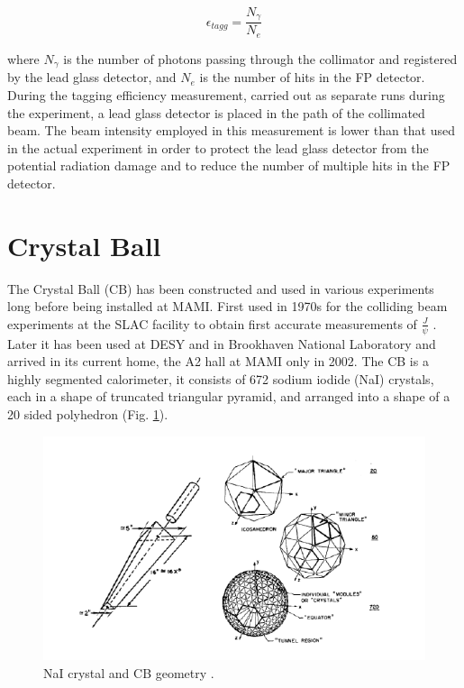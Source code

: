 \begin{equation}
\epsilon_{tagg}=\frac{N_{\gamma}}{N_{e}}
\end{equation}

\indent where $N_{\gamma}$ is the number of photons passing through the collimator and registered by the lead glass detector, and $N_{e}$ is the number of hits in the FP detector. During the tagging efficiency measurement, carried out as separate runs during the experiment, a lead glass detector is placed in the path of the collimated beam. The beam intensity employed in this measurement is lower than that used in the actual experiment in order to protect the lead glass detector from the potential radiation damage and to reduce the number of multiple hits in the FP detector.

\section{Crystal Ball}

\indent The Crystal Ball (CB) has been constructed and used in various experiments long before  being  installed  at  MAMI.  First  used  in  1970s  for  the  colliding  beam experiments at the SLAC facility to obtain first accurate measurements of $\frac{J}{\psi}$ \cite {oreglia}. Later it has been used at DESY and in Brookhaven National Laboratory and arrived in its current home, the A2 hall at MAMI only in 2002. The CB is a highly segmented calorimeter, it consists of 672 sodium iodide (NaI) crystals, each in a shape of truncated triangular pyramid, and arranged into a shape of a 20 sided polyhedron (Fig. \ref{naigeom}).

\begin{figure}[H]
\begin{center}
\includegraphics[scale=0.7]{naigeom.png}
\caption{NaI crystal and CB geometry \cite{a2mami}.}
\label{naigeom}
\end{center}
\end{figure}


